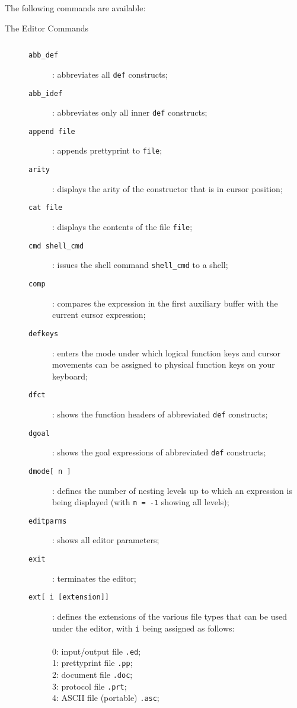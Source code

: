 \begin{description}
The following commands are available:
\\
\begin{description}

\item[{\rm The Editor Commands}] $\;$\\
\begin{description}
\item[{\tt abb\_def}]: abbreviates all {\tt def} constructs;
\item[{\tt abb\_idef}]: abbreviates only all inner {\tt def} constructs;
\item[{\tt append file}]: appends prettyprint to {\tt file};
\item[{\tt arity}]: displays the arity of the constructor that is in
cursor position;
\item[{\tt cat file}]: displays the contents of the file {\tt file};
\item[{\tt cmd shell\_cmd}]: issues the shell command {\tt shell\_cmd} to a shell;
\item[{\tt comp}]: compares the expression in the first auxiliary buffer with the current cursor expression;
\item[{\tt defkeys}]: enters the mode under which logical function keys and cursor movements can be assigned to physical function keys on 
your keyboard;
\item[{\tt dfct}]: shows the function headers of abbreviated {\tt def}
constructs;
\item[{\tt dgoal}]: shows the goal expressions of abbreviated {\tt def}
constructs;
\item[{\tt dmode[ n ]}]: defines the number of nesting levels up to 
which an expression is being displayed (with {\tt n = -1} showing all
 levels);
\item[{\tt editparms}]: shows all editor parameters;
\item[{\tt exit}]: terminates the editor;
\item[{\tt ext[ i [extension]]}]: defines the extensions of the various file types that can be used under the \pired editor, with {\tt i} being assigned as follows:
\\
\\0: input/output file   {\tt .ed};
\\1: prettyprint file    {\tt .pp};
\\2: document file       {\tt .doc};
\\3: protocol file       {\tt .prt};
\\4: ASCII file (portable) {\tt .asc};

\end{description}
\end{description}
\end{description}

